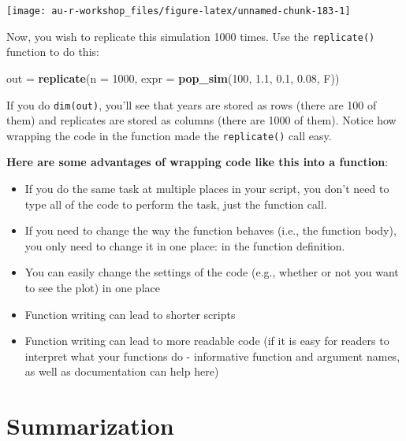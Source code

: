 \documentclass[]{book}
\newenvironment{Shaded}{\begin{snugshade}}{\end{snugshade}}
\newcommand{\KeywordTok}[1]{\textcolor[rgb]{0.13,0.29,0.53}{\textbf{#1}}}
\newcommand{\DataTypeTok}[1]{\textcolor[rgb]{0.13,0.29,0.53}{#1}}
\newcommand{\DecValTok}[1]{\textcolor[rgb]{0.00,0.00,0.81}{#1}}
\newcommand{\FloatTok}[1]{\textcolor[rgb]{0.00,0.00,0.81}{#1}}
\newcommand{\StringTok}[1]{\textcolor[rgb]{0.31,0.60,0.02}{#1}}
\newcommand{\NormalTok}[1]{#1}
\providecommand{\tightlist}{%
  \setlength{\itemsep}{0pt}\setlength{\parskip}{0pt}}
\theoremstyle{definition}
\theoremstyle{definition}
\theoremstyle{definition}
\theoremstyle{remark}
\begin{document}
\begin{center}\texttt{[image: au-r-workshop\_files/figure-latex/unnamed-chunk-183-1]} \end{center}

Now, you wish to replicate this simulation 1000 times. Use the
\texttt{replicate()} function to do this:

\begin{Shaded}
\begin{Highlighting}[]
\NormalTok{out =}\StringTok{ }\KeywordTok{replicate}\NormalTok{(}\DataTypeTok{n =} \DecValTok{1000}\NormalTok{, }\DataTypeTok{expr =} \KeywordTok{pop_sim}\NormalTok{(}\DecValTok{100}\NormalTok{, }\FloatTok{1.1}\NormalTok{, }\FloatTok{0.1}\NormalTok{, }\FloatTok{0.08}\NormalTok{, F))}
\end{Highlighting}
\end{Shaded}

If you do \texttt{dim(out)}, you'll see that years are stored as rows
(there are 100 of them) and replicates are stored as columns (there are
1000 of them). Notice how wrapping the code in the function made the
\texttt{replicate()} call easy.

\textbf{Here are some advantages of wrapping code like this into a
function}:

\begin{itemize}
\tightlist
\item
  If you do the same task at multiple places in your script, you don't
  need to type all of the code to perform the task, just the function
  call.
\item
  If you need to change the way the function behaves (i.e., the function
  body), you only need to change it in one place: in the function
  definition.
\item
  You can easily change the settings of the code (e.g., whether or not
  you want to see the plot) in one place
\item
  Function writing can lead to shorter scripts
\item
  Function writing can lead to more readable code (if it is easy for
  readers to interpret what your functions do - informative function and
  argument names, as well as documentation can help here)
\end{itemize}

\section{Summarization}\label{mc-summaries}
\end{document}
